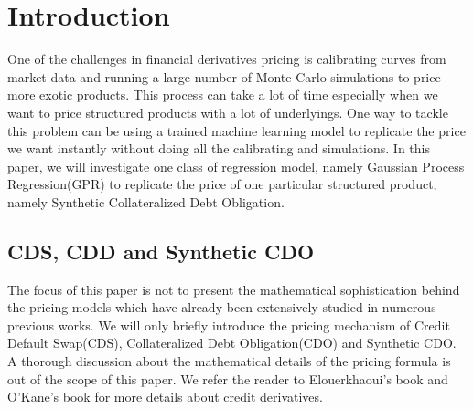\documentclass[11pt,a4paper]{article}
\theoremstyle{definition}
\numberwithin{equation}{section}
\begin{document}
	
	
	
	\setcounter{tocdepth}{4}
	
	\tableofcontents %
	
	\newpage %
	
	\fancyhead{}
	\fancyfoot{}
	\pagestyle{fancy} 
	\fancyhead[RO,LE]{\sffamily\small \thepage}
	\fancyhead[LO,RE]{\sffamily\small \nouppercase{\rightmark}}
	\renewcommand{\headrulewidth}{0.35pt}
	\renewcommand{\footrulewidth}{0.0pt}
	
	
	
	
	
	\section{Introduction}
	One of the challenges in financial derivatives pricing is calibrating curves from market data and running a large number of Monte Carlo simulations to price more exotic products. This process can take a lot of time especially when we want to price structured products with a lot of underlyings. One way to tackle this problem can be using a trained machine learning model to replicate the price we want instantly without doing all the calibrating and simulations. In this paper, we will investigate one class of regression model, namely Gaussian Process Regression(GPR) to replicate the price of one particular structured product, namely Synthetic Collateralized Debt Obligation.
	
	\subsection{CDS, CDD and Synthetic CDO}
	The focus of this paper is not to present the mathematical sophistication behind the pricing models which have already been extensively studied in numerous previous works. We will only briefly introduce the pricing mechanism of Credit Default Swap(CDS), Collateralized Debt Obligation(CDO) and Synthetic CDO. A thorough discussion about the mathematical details of the pricing formula is out of the scope of this paper. We refer the reader to Elouerkhaoui's book\cite{Elouerkhaoui} and O'Kane's book\cite{okane} for more details about credit derivatives.
	
\end{document}
